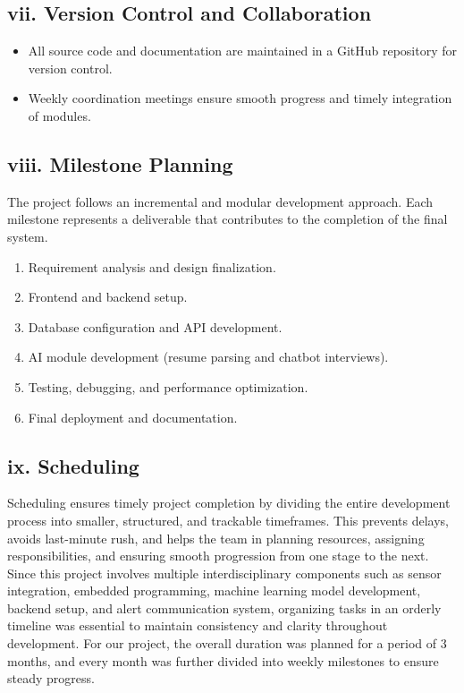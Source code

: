 \documentclass[a4paper, 12pt]{report}
\begin{document}
\subsection*{vii. Version Control and Collaboration}
\begin{itemize}[itemsep=-4pt]
    \item All source code and documentation are maintained in a GitHub repository for version control.
    \item Weekly coordination meetings ensure smooth progress and timely integration of modules.
\end{itemize}

\subsection*{viii. Milestone Planning}
The project follows an incremental and modular development approach. 
Each milestone represents a deliverable that contributes to the completion of the final system.

\begin{enumerate}[itemsep=-4pt]
    \item Requirement analysis and design finalization.
    \item Frontend and backend setup.
    \item Database configuration and API development.
    \item AI module development (resume parsing and chatbot interviews).
    \item Testing, debugging, and performance optimization.
    \item Final deployment and documentation.
\end{enumerate}


\subsection*{ix. Scheduling}
Scheduling ensures timely project completion by dividing the entire development 
process into smaller, structured, and trackable timeframes. This prevents delays, avoids last-minute rush, and helps the team in planning resources, assigning responsibilities, and ensuring smooth progression from one stage to the next. Since this project involves multiple interdisciplinary components such as sensor integration, embedded programming, machine learning model 
development, backend setup, and alert communication system, organizing tasks in an orderly timeline was essential to maintain consistency and clarity throughout development. For our project, the overall duration was planned for a period of 3 months, and every month was further divided into weekly milestones to ensure steady progress.
\end{document}
